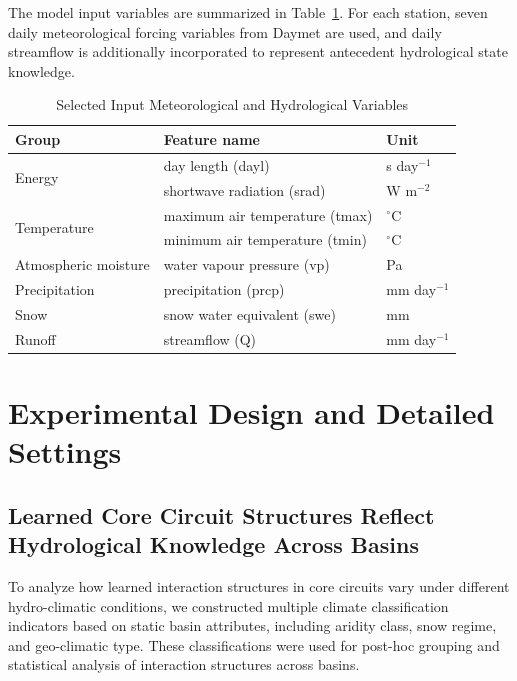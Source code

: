 \documentclass[11pt]{article}
\begin{document}
The model input variables are summarized in Table~\ref{tab:input_features}. For each station, seven daily meteorological forcing variables from Daymet are used, and daily streamflow is additionally incorporated to represent antecedent hydrological state knowledge.

\begin{table}[htbp]
	\centering
	\caption{Selected Input Meteorological and Hydrological Variables}
	\label{tab:input_features}
	\begin{tabular*}{\textwidth}{@{\extracolsep{\fill}}lll}
		\toprule
		Group & Feature name & Unit \\
		\midrule
		\multirow{2}{*}{Energy} & day length (dayl) & s day$^{-1}$ \\
		& shortwave radiation (srad) & W m$^{-2}$ \\
		\multirow{2}{*}{Temperature} & maximum air temperature (tmax) & $^\circ$C \\
		& minimum air temperature (tmin) & $^\circ$C \\
		Atmospheric moisture & water vapour pressure (vp) & Pa \\
		Precipitation & precipitation (prcp) & mm day$^{-1}$ \\
		Snow & snow water equivalent (swe) & mm \\
		Runoff & streamflow (Q) & mm day$^{-1}$ \\
		\bottomrule
	\end{tabular*}
\end{table}

\section{Experimental Design and Detailed Settings}

\subsection{Learned Core Circuit Structures Reflect Hydrological Knowledge Across Basins}
\label{sec:knowledge}

To analyze how learned interaction structures in core circuits vary under different hydro-climatic conditions, we constructed multiple climate classification indicators based on static basin attributes, including aridity class, snow regime, and geo-climatic type\cite{hess-camels}. These classifications were used for post-hoc grouping and statistical analysis of interaction structures across basins.
\end{document}
